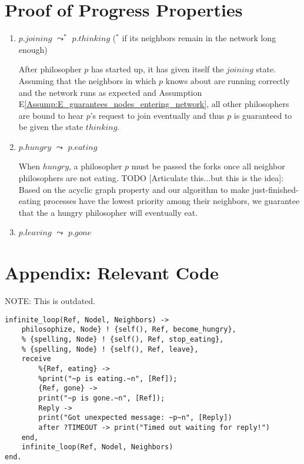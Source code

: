 \documentclass[11pt]{article}
\begin{document}
\section{Proof of Progress Properties}
\begin{enumerate}[PG1]
\item
$p.joining$ $\leadsto^*$ $p.thinking$ ($^*$ if its neighbors remain in the network long enough) 

\indent After philosopher $p$ has started up, it has given itself the $joining$ state. Assuming that the neighbors in which $p$ knows about are running correctly and the network runs as expected and Assumption E\ref{Assump:E_guarantees_nodes_entering_network}, all other philosophers are bound to hear $p$'s request to join eventually and thus $p$ is guaranteed to be given the state $thinking$.

\item  $p.hungry$ $\leadsto$ $p.eating$

\indent When $hungry$, a philosopher $p$ must be passed the forks once all neighbor philosophers are not eating. TODO [Articulate this...but this is the idea]: Based on the acyclic graph property and our algorithm to make just-finished-eating processes have the lowest priority among their neighbors, we guarantee that the a hungry philosopher will eventually eat.

\item 
$p.leaving$ $\leadsto$ $p.gone$
\end{enumerate}

\section{Appendix: Relevant Code}
NOTE: This is outdated.
\begin{lstlisting}
infinite_loop(Ref, Nodel, Neighbors) ->
    philosophize, Node} ! {self(), Ref, become_hungry},
    % {spelling, Node} ! {self(), Ref, stop_eating},
    % {spelling, Node} ! {self(), Ref, leave},
    receive
        %{Ref, eating} ->          
        %print("~p is eating.~n", [Ref]);
        {Ref, gone} ->
        print("~p is gone.~n", [Ref]);
        Reply ->
        print("Got unexpected message: ~p~n", [Reply])
        after ?TIMEOUT -> print("Timed out waiting for reply!")
    end,
    infinite_loop(Ref, Nodel, Neighbors)
end.
\end{lstlisting}
\end{document}
